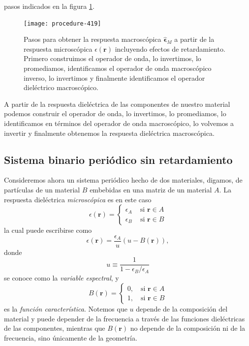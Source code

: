 \documentclass[12pt]{article}
\begin{document}
pasos indicados en la figura \ref{fig:circulo}.
\begin{figure}
  \centering
  \texttt{[image: procedure-419]}
  \caption{Pasos para obtener la respuesta macroscópica
    $\hat{\bm \epsilon}_M$ a partir de la respuesta microscópica
    $\epsilon(\bm r)$ incluyendo efectos de retardamiento. Primero
    construimos el operador de onda, lo
    invertimos, lo promediamos, identificamos el operador de onda
    macroscópico inverso, lo invertimos y finalmente identificamos el
    operador dieléctrico macroscópico.}
  \label{fig:circulo}
\end{figure}
A partir de la respuesta dieléctrica de las componentes de nuestro
material podemos construir el operador de onda, lo invertimos, lo
promediamos, lo identificamos en términos del operador de onda
macroscópico, lo volvemos a invertir y finalmente obtenemos la
respuesta dieléctrica  macroscópica.\cite{samuel}

\subsection{Sistema binario periódico sin retardamiento}
\label{binario}
Consideremos ahora un sistema periódico hecho de dos materiales,
digamos, de partículas de un material $B$ embebidas en una matriz de
un material $A$. La respuesta dieléctrica {\em microscópica} es en
este caso
\begin{equation}
  \label{eq:epsmic}
  \epsilon(\bm r)=\left\{
      \begin{matrix}
        \epsilon_A\,\quad\text{si $\bm r\in A$}\\
        \epsilon_B\,\quad\text{si $\bm r\in B$}
      \end{matrix}
    \right.
\end{equation}
la cual puede escribirse como
\begin{equation}
  \label{eq:epsmic1}
  \epsilon(\bm r)=\frac{\epsilon_A}{u}(u-B(\bm r)),
\end{equation}
donde
\begin{equation}
  \label{eq:u}
  u\equiv\frac{1}{1-\epsilon_B/\epsilon_A}
\end{equation}
se conoce como la {\em variable espectral}, y
\begin{equation}
  \label{eq:B}
  B(\bm r)=\left\{
      \begin{matrix}
        0,\quad\text{si $\bm r\in A$}\\
        1,\quad\text{si $\bm r\in B$}
      \end{matrix}
    \right.
\end{equation}
es la {\em función característica}. Notemos que $u$ depende de la
composición del material y puede depender de la frecuencia a través de
las funciones dieléctricas de las componentes, mientras que $B(\bm r)$ no
depende de la composición ni de la frecuencia, sino únicamente de la
geometría.
\end{document}

